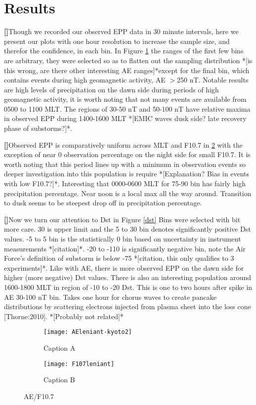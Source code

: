 \documentclass{article}
\newcounter{para}
\newcommand\mypara{\par\refstepcounter{para}\textbf{[\thepara]}\space}
\begin{document}
\section{Results}
\mypara Though we recorded our observed EPP data in 30 minute intervals, here we present our plots with one hour resolution to increase the sample size, and therefor the confidence, in each bin. In Figure \ref{fig:ae:ae} the ranges of the first few bins are arbitrary, they were selected so as to flatten out the sampling distribution *[is this wrong, are there other interesting AE ranges]*except for the final bin, which contains events during high geomagnetic activity, AE $>$250 nT. Notable results are high levels of precipitation on the dawn side during periods of high geomagnetic activity, it is worth noting that not many events are available from 0500 to 1100 MLT. The regions of 30-50 nT and 50-100 nT have relative maxima in observed EPP during 1400-1600 MLT *[EMIC waves dusk side? late recovery phase of substorms?]*.  \mypara Observed EPP is comparatively uniform across MLT and F10.7 in \ref{fig:ae:f107} with the exception of near 0 observation percentage on the night side for small F10.7. It is worth noting that this period lines up with a minimum in observation events so deeper investigation into this population is require *[Explanation? Bias in events with low F10.7?]*. Interesting that 0000-0600 MLT for 75-90 bin has fairly high precipitation percentage.  Near noon is a local max all the way around. Transition to dusk seems to be steepest drop off in precipitation percentage. 
\mypara Now we turn our attention to Dst in Figure \ref{dst} Bins were selected with bit more care. 30 is upper limit and the 5 to 30 bin denotes significantly positive Dst values. -5 to 5 bin is the statistically 0 bin based on uncertainty in instrument measurements *[citation]*. -20 to -110 is significantly negative bin, note the Air Force's definition of substorm is below -75 *[citation, this only qualifies to 3 experiments]*.  Like with AE, there is more observed EPP on the dawn side for higher (more negative) Dst values.  There is also an interesting population around 1600-1800 MLT in region of -10 to -20 Dst. This is one to two hours after spike in AE 30-100 nT bin. Takes one hour for chorus waves to create pancake distributions by scattering electrons injected from plasma sheet into the loss cone [Thorne:2010]. *[Probably not related]*
\begin{figure}
    \centering
    \begin{subfigure}[h]{0.48\linewidth}        %
        \centering
        \texttt{[image: AEleniant-kyoto2]}
        \caption{Caption A}
        \label{fig:ae:ae}
    \end{subfigure}
    \begin{subfigure}[h]{0.48\linewidth}        %
        \centering
        \texttt{[image: F107leniant]}
        \caption{Caption B}
        \label{fig:ae:f107}
    \end{subfigure}
    \caption{AE/F10.7}
    \label{fig:ae}
\end{figure}
\end{document}
